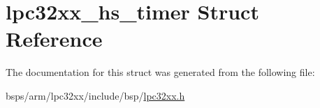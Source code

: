 \hypertarget{structlpc32xx__hs__timer}{}\section{lpc32xx\+\_\+hs\+\_\+timer Struct Reference}
\label{structlpc32xx__hs__timer}


The documentation for this struct was generated from the following file\+:\begin{DoxyCompactItemize}
\item 
bsps/arm/lpc32xx/include/bsp/\mbox{\hyperlink{lpc32xx_8h}{lpc32xx.\+h}}\end{DoxyCompactItemize}
